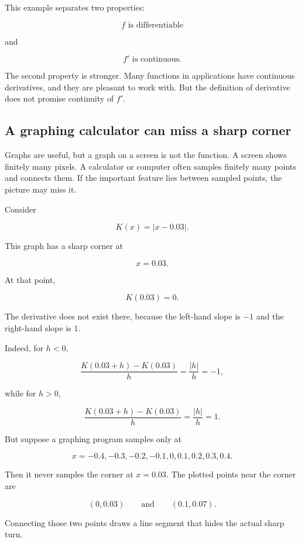This example separates two properties:

\[
\text{\(f\) is differentiable}
\]

and

\[
\text{\(f'\) is continuous.}
\]

The second property is stronger.  Many functions in applications have continuous derivatives, and they are pleasant to work with.  But the definition of derivative does not promise continuity of \(f'\).

\subsection{A graphing calculator can miss a sharp corner}
\label{subsec:calculator-misses-corner}

Graphs are useful, but a graph on a screen is not the function.  A screen shows finitely many pixels.  A calculator or computer often samples finitely many points and connects them.  If the important feature lies between sampled points, the picture may miss it.

Consider

\[
K(x)=|x-0.03|.
\]

This graph has a sharp corner at

\[
x=0.03.
\]

At that point,

\[
K(0.03)=0.
\]

The derivative does not exist there, because the left-hand slope is \(-1\) and the right-hand slope is \(1\).

Indeed, for \(h<0\),

\[
\frac{K(0.03+h)-K(0.03)}{h}
=
\frac{|h|}{h}
=
-1,
\]

while for \(h>0\),

\[
\frac{K(0.03+h)-K(0.03)}{h}
=
\frac{|h|}{h}
=
1.
\]

But suppose a graphing program samples only at

\[
x=-0.4,-0.3,-0.2,-0.1,0,0.1,0.2,0.3,0.4.
\]

Then it never samples the corner at \(x=0.03\).  The plotted points near the corner are

\[
(0,0.03)
\qquad\text{and}\qquad
(0.1,0.07).
\]

Connecting those two points draws a line segment that hides the actual sharp turn.

